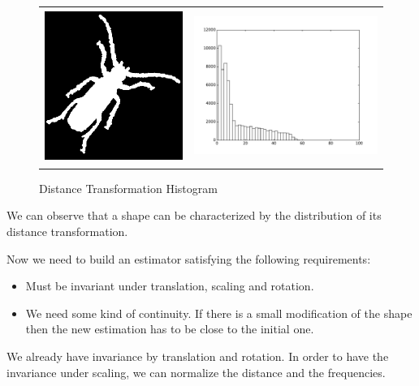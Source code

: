 \documentclass[a4paper, 11pt]{article}
\begin{document}
\begin{figure}[h!]
\begin{tabular}{ll}
\includegraphics[width=5cm]{beetle.png} &
\includegraphics[height=5cm]{beetle-dthist.pdf} \\
\end{tabular}
\caption{Distance Transformation Histogram}
\end{figure}

\noindent We can observe that a shape can be characterized by the distribution of its distance transformation.

\noindent Now we need to build an estimator satisfying the following requirements:
\begin{itemize}
	\item Must be invariant under translation, scaling and rotation.
	\item We need some kind of continuity. If there is a small modification of the shape then the new estimation has to be close to the initial one.
\end{itemize}
We already have invariance by translation and rotation. In order to have the invariance under scaling, we can normalize the distance and the frequencies.
\end{document}

